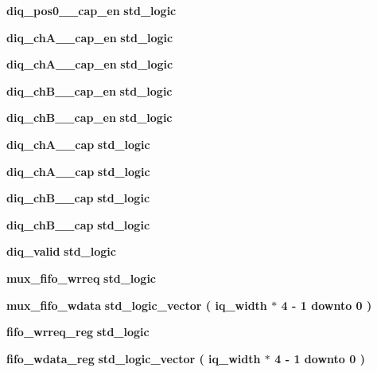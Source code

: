 \begin{DoxyCompactItemize}
\item 
{\bf diq\+\_\+pos0\+\_\+\_\+cap\+\_\+en} {\bfseries \textcolor{comment}{std\+\_\+logic}\textcolor{vhdlchar}{ }} 
\item 
{\bf diq\+\_\+ch\+A\+\_\+\_\+cap\+\_\+en} {\bfseries \textcolor{comment}{std\+\_\+logic}\textcolor{vhdlchar}{ }} 
\item 
{\bf diq\+\_\+ch\+A\+\_\+\_\+cap\+\_\+en} {\bfseries \textcolor{comment}{std\+\_\+logic}\textcolor{vhdlchar}{ }} 
\item 
{\bf diq\+\_\+ch\+B\+\_\+\_\+cap\+\_\+en} {\bfseries \textcolor{comment}{std\+\_\+logic}\textcolor{vhdlchar}{ }} 
\item 
{\bf diq\+\_\+ch\+B\+\_\+\_\+cap\+\_\+en} {\bfseries \textcolor{comment}{std\+\_\+logic}\textcolor{vhdlchar}{ }} 
\item 
{\bf diq\+\_\+ch\+A\+\_\+\_\+cap} {\bfseries \textcolor{comment}{std\+\_\+logic}\textcolor{vhdlchar}{ }} 
\item 
{\bf diq\+\_\+ch\+A\+\_\+\_\+cap} {\bfseries \textcolor{comment}{std\+\_\+logic}\textcolor{vhdlchar}{ }} 
\item 
{\bf diq\+\_\+ch\+B\+\_\+\_\+cap} {\bfseries \textcolor{comment}{std\+\_\+logic}\textcolor{vhdlchar}{ }} 
\item 
{\bf diq\+\_\+ch\+B\+\_\+\_\+cap} {\bfseries \textcolor{comment}{std\+\_\+logic}\textcolor{vhdlchar}{ }} 
\item 
{\bf diq\+\_\+valid} {\bfseries \textcolor{comment}{std\+\_\+logic}\textcolor{vhdlchar}{ }} 
\item 
{\bf mux\+\_\+fifo\+\_\+wrreq} {\bfseries \textcolor{comment}{std\+\_\+logic}\textcolor{vhdlchar}{ }} 
\item 
{\bf mux\+\_\+fifo\+\_\+wdata} {\bfseries \textcolor{comment}{std\+\_\+logic\+\_\+vector}\textcolor{vhdlchar}{ }\textcolor{vhdlchar}{(}\textcolor{vhdlchar}{ }\textcolor{vhdlchar}{ }\textcolor{vhdlchar}{ }\textcolor{vhdlchar}{ }{\bfseries {\bf iq\+\_\+width}} \textcolor{vhdlchar}{$\ast$}\textcolor{vhdlchar}{ } \textcolor{vhdldigit}{4} \textcolor{vhdlchar}{-\/}\textcolor{vhdlchar}{ } \textcolor{vhdldigit}{1} \textcolor{vhdlchar}{ }\textcolor{keywordflow}{downto}\textcolor{vhdlchar}{ }\textcolor{vhdlchar}{ } \textcolor{vhdldigit}{0} \textcolor{vhdlchar}{ }\textcolor{vhdlchar}{)}\textcolor{vhdlchar}{ }} 
\item 
{\bf fifo\+\_\+wrreq\+\_\+reg} {\bfseries \textcolor{comment}{std\+\_\+logic}\textcolor{vhdlchar}{ }} 
\item 
{\bf fifo\+\_\+wdata\+\_\+reg} {\bfseries \textcolor{comment}{std\+\_\+logic\+\_\+vector}\textcolor{vhdlchar}{ }\textcolor{vhdlchar}{(}\textcolor{vhdlchar}{ }\textcolor{vhdlchar}{ }\textcolor{vhdlchar}{ }\textcolor{vhdlchar}{ }{\bfseries {\bf iq\+\_\+width}} \textcolor{vhdlchar}{$\ast$}\textcolor{vhdlchar}{ } \textcolor{vhdldigit}{4} \textcolor{vhdlchar}{-\/}\textcolor{vhdlchar}{ } \textcolor{vhdldigit}{1} \textcolor{vhdlchar}{ }\textcolor{keywordflow}{downto}\textcolor{vhdlchar}{ }\textcolor{vhdlchar}{ } \textcolor{vhdldigit}{0} \textcolor{vhdlchar}{ }\textcolor{vhdlchar}{)}\textcolor{vhdlchar}{ }} 

\end{DoxyCompactItemize}

